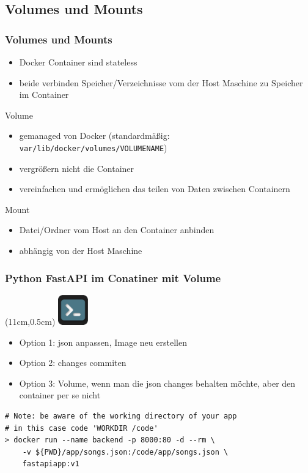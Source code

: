 \documentclass[22pt]{beamer}
\newcommand{\code}[1]{\colorbox{gray!15}{\texttt{#1}}}
\newcommand{\terminal}{
    \begin{textblock*}{1.3cm}(11cm,0.5cm) %
    \includegraphics[width=1.3cm]{Bilder/terminal2.png}
    \end{textblock*}
}
\begin{document}
\subsection{Volumes und Mounts}
\begin{frame}[t]
    \frametitle{Volumes und Mounts}
    \begin{itemize}
        \item Docker Container sind stateless
        \item beide verbinden Speicher/Verzeichnisse vom der Host Maschine zu Speicher im Container
    \end{itemize} \pause
    \begin{block}{Volume}
        \begin{itemize}
            \item gemanaged von Docker (standardmäßig: \code{var/lib/docker/volumes/VOLUMENAME})
            \item vergrößern nicht die Container
            \item vereinfachen und ermöglichen das teilen von Daten zwischen Containern
        \end{itemize}
    \end{block} \pause
    \begin{block}{Mount}
        \begin{itemize}
            \item Datei/Ordner vom Host an den Container anbinden
            \item abhängig von der Host Maschine
        \end{itemize}
    \end{block}
\end{frame}

\begin{frame}[fragile]
    \frametitle{Python FastAPI im Conatiner mit Volume}
    \terminal
    \begin{itemize}
        \item Option 1: json anpassen, Image neu erstellen
        \item Option 2: changes commiten
        \item Option 3: Volume, wenn man die json changes behalten möchte, aber den container per se nicht
    \end{itemize}
\vspace{0.8cm}
\begin{verbatim}
# Note: be aware of the working directory of your app
# in this case code 'WORKDIR /code'
> docker run --name backend -p 8000:80 -d --rm \
    -v ${PWD}/app/songs.json:/code/app/songs.json \
    fastapiapp:v1
\end{verbatim}
            
\end{frame}
\end{document}
